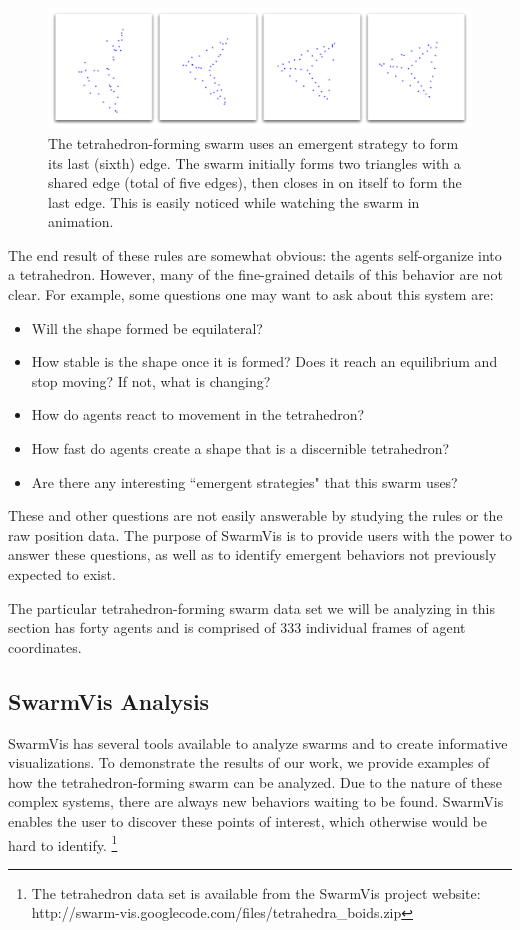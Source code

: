 \documentclass{vgtc}
\begin{document}
\begin{figure}[ht]
\centering
\includegraphics[scale=.45]{images/tetraclosing.pdf}
\caption{
The tetrahedron-forming swarm uses an emergent strategy to form its last (sixth) edge.
The swarm initially forms two triangles with a shared edge (total of five edges), then
closes in on itself to form the last edge. This is easily noticed while watching the swarm in animation.}
\label{TetraClosing}
\end{figure}

The end result of these rules are somewhat obvious: the agents self-organize into a tetrahedron.
However, many of the fine-grained details of this behavior are not clear.
For example, some questions one may want to ask about this system are: 
\begin{itemize}
\item Will the shape formed be equilateral?
\item How stable is the shape once it is formed? Does it reach an equilibrium and stop moving? If not, what is changing?
\item How do agents react to movement in the tetrahedron?
\item How fast do agents create a shape that is a discernible tetrahedron?
\item Are there any interesting ``emergent strategies" that this swarm uses?
\end{itemize}
These and other questions are not easily answerable by studying the rules or the raw position data.
The purpose of SwarmVis is to provide users with the power to answer these questions,
as well as to identify emergent behaviors not previously expected to exist.

The particular tetrahedron-forming swarm data set we will be analyzing in this section has forty agents
and is comprised of 333 individual frames of agent coordinates.



\subsection{SwarmVis Analysis}
SwarmVis has several tools available to analyze swarms and to create informative visualizations.
To demonstrate the results of our work, we provide examples of how the tetrahedron-forming swarm can be analyzed.
Due to the nature of these complex systems, there are always new behaviors waiting to be found.
SwarmVis enables the user to discover these points of interest, which otherwise would be hard to identify.
\footnote{The tetrahedron
data set is available from the SwarmVis project website: http://swarm-vis.googlecode.com/files/tetrahedra\_boids.zip}
\end{document}
